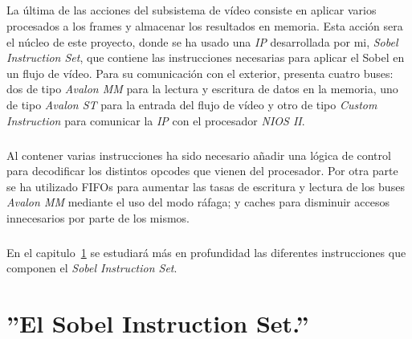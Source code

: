 \documentclass[a4paper,12pt,titlepage,final]{book}
\begin{document}
\subsubsection*{}
\paragraph{}
La última de las acciones del subsistema de vídeo consiste en aplicar varios procesados a los frames y almacenar los resultados en memoria. Esta acción sera el núcleo de este proyecto, donde se ha usado una \textit{IP} desarrollada por mi, \textit{Sobel Instruction Set}, que contiene las instrucciones necesarias para aplicar el Sobel en un flujo de vídeo. Para su comunicación con el exterior, presenta cuatro buses: dos de tipo \textit{Avalon MM} para la lectura y escritura de datos en la memoria, uno de tipo \textit{Avalon ST} para la entrada del flujo de vídeo y otro de tipo \textit{Custom Instruction} para comunicar la \textit{IP} con el procesador \textit{NIOS II}. 

\paragraph{}
Al contener varias instrucciones ha sido necesario añadir una lógica de control para decodificar los distintos opcodes que vienen del procesador. Por otra parte se ha utilizado FIFOs para aumentar las tasas de escritura y lectura de los buses \textit{Avalon MM} mediante el uso del modo ráfaga; y caches para disminuir accesos innecesarios por parte de los mismos.

\paragraph{}
En el capitulo~\ref{sec:SIS} se estudiará más en profundidad las diferentes instrucciones que componen el \textit{Sobel Instruction Set}.

\chapter{''El Sobel Instruction Set.''} \label{sec:SIS}
\section*{}
\subsection*{}
\subsubsection*{}
\end{document}
